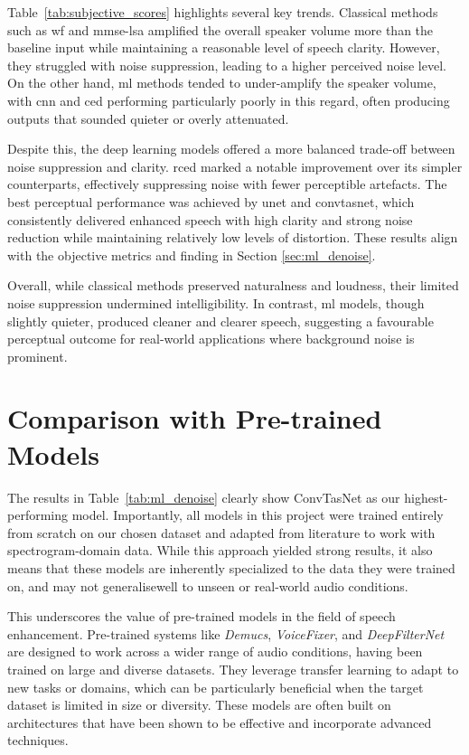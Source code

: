 Table~\ref{tab:subjective_scores} highlights several key trends. Classical methods such as \gls{wf} and \gls{mmse-lsa} amplified the overall speaker volume more than the baseline input while maintaining a reasonable level of speech clarity. However, they struggled with noise suppression, leading to a higher perceived noise level. On the other hand, \gls{ml} methods tended to under-amplify the speaker volume, with \gls{cnn} and \gls{ced} performing particularly poorly in this regard, often producing outputs that sounded quieter or overly attenuated.

Despite this, the deep learning models offered a more balanced trade-off between noise suppression and clarity. \gls{rced} marked a notable improvement over its simpler counterparts, effectively suppressing noise with fewer perceptible artefacts. The best perceptual performance was achieved by \gls{unet} and \gls{convtasnet}, which consistently delivered enhanced speech with high clarity and strong noise reduction while maintaining relatively low levels of distortion. These results align with the objective metrics and finding in Section \ref{sec:ml_denoise}.

Overall, while classical methods preserved naturalness and loudness, their limited noise suppression undermined intelligibility. In contrast, \gls{ml} models, though slightly quieter, produced cleaner and clearer speech, suggesting a favourable perceptual outcome for real-world applications where background noise is prominent.

\section{Comparison with Pre-trained Models}
\label{sec:pretrained_comparison}

The results in Table~\ref{tab:ml_denoise} clearly show ConvTasNet as our highest-performing model. Importantly, all models in this project were trained entirely from scratch on our chosen dataset and adapted from literature to work with spectrogram-domain data. While this approach yielded strong results, it also means that these models are inherently specialized to the data they were trained on, and may not generalisewell to unseen or real-world audio conditions.

This underscores the value of pre-trained models in the field of speech enhancement. Pre-trained systems like \textit{Demucs}, \textit{VoiceFixer}, and \textit{DeepFilterNet} are designed to work across a wider range of audio conditions, having been trained on large and diverse datasets. They leverage transfer learning to adapt to new tasks or domains, which can be particularly beneficial when the target dataset is limited in size or diversity. These models are often built on architectures that have been shown to be effective and incorporate advanced techniques.


